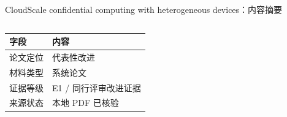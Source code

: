 \begin{frame}[t,shrink=6]{CloudScale confidential computing with heterogeneous devices：内容摘要}
\begin{columns}[T,totalwidth=\textwidth]
\begin{column}{0.49\textwidth}
{\begin{minipage}[t]{0.97\linewidth}
\begin{minipage}{0.92\linewidth}
      \scriptsize {\tiny
\begin{tabularx}{\linewidth}{@{}YY@{}}
\toprule
\textbf{字段} & \textbf{内容} \\
\midrule
论文定位 & 代表性改进 \\
材料类型 & 系统论文 \\
证据等级 & E1 / 同行评审改进证据 \\
来源状态 & 本地 PDF 已核验 \\
\bottomrule
\end{tabularx}
}
    \end{minipage}
    \vspace{1mm}
  \end{minipage}}
  \end{column}
\end{columns}
\end{frame}


